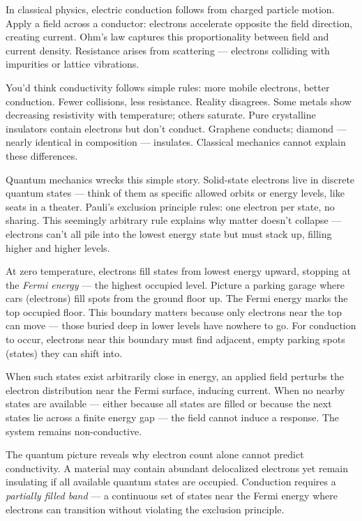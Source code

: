 In classical physics, electric conduction follows from charged particle motion. Apply a field across a conductor: electrons accelerate opposite the field direction, creating current. Ohm's law captures this proportionality between field and current density. Resistance arises from scattering — electrons colliding with impurities or lattice vibrations.

You'd think conductivity follows simple rules: more mobile electrons, better conduction. Fewer collisions, less resistance. Reality disagrees. Some metals show decreasing resistivity with temperature; others saturate. Pure crystalline insulators contain electrons but don't conduct. Graphene conducts; diamond — nearly identical in composition — insulates. Classical mechanics cannot explain these differences.

Quantum mechanics wrecks this simple story. Solid-state electrons live in discrete quantum states — think of them as specific allowed orbits or energy levels, like seats in a theater. Pauli's exclusion principle rules: one electron per state, no sharing. This seemingly arbitrary rule explains why matter doesn't collapse — electrons can't all pile into the lowest energy state but must stack up, filling higher and higher levels.

At zero temperature, electrons fill states from lowest energy upward, stopping at the \emph{Fermi energy} — the highest occupied level. Picture a parking garage where cars (electrons) fill spots from the ground floor up. The Fermi energy marks the top occupied floor. This boundary matters because only electrons near the top can move — those buried deep in lower levels have nowhere to go. For conduction to occur, electrons near this boundary must find adjacent, empty parking spots (states) they can shift into.

When such states exist arbitrarily close in energy, an applied field perturbs the electron distribution near the Fermi surface, inducing current. When no nearby states are available — either because all states are filled or because the next states lie across a finite energy gap — the field cannot induce a response. The system remains non-conductive.

The quantum picture reveals why electron count alone cannot predict conductivity. A material may contain abundant delocalized electrons yet remain insulating if all available quantum states are occupied. Conduction requires a \emph{partially filled band} — a continuous set of states near the Fermi energy where electrons can transition without violating the exclusion principle.

